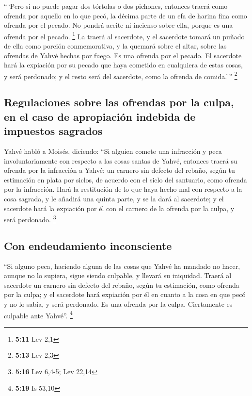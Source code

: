 \begin{paracol}{2}
 ``\,`Pero si no puede pagar dos tórtolas o dos pichones,
entonces traerá como ofrenda por aquello en lo que pecó, la décima parte
de un efa de harina fina como ofrenda por el pecado. No pondrá aceite ni
incienso sobre ella, porque es una ofrenda por el pecado. \footnote{\textbf{5:11}
  Lev 2,1}  La traerá al sacerdote, y el sacerdote tomará
un puñado de ella como porción conmemorativa, y la quemará sobre el
altar, sobre las ofrendas de Yahvé hechas por fuego. Es una ofrenda por
el pecado.  El sacerdote hará la expiación por su pecado
que haya cometido en cualquiera de estas cosas, y será perdonado; y el
resto será del sacerdote, como la ofrenda de comida.'\,'' \footnote{\textbf{5:13}
  Lev 2,3}

\hypertarget{regulaciones-sobre-las-ofrendas-por-la-culpa-en-el-caso-de-apropiaciuxf3n-indebida-de-impuestos-sagrados}{%
\subsection{Regulaciones sobre las ofrendas por la culpa, en el caso de
apropiación indebida de impuestos
sagrados}\label{regulaciones-sobre-las-ofrendas-por-la-culpa-en-el-caso-de-apropiaciuxf3n-indebida-de-impuestos-sagrados}}

 Yahvé habló a Moisés, diciendo:  ``Si
alguien comete una infracción y peca involuntariamente con respecto a
las cosas santas de Yahvé, entonces traerá su ofrenda por la infracción
a Yahvé: un carnero sin defecto del rebaño, según tu estimación en plata
por siclos, de acuerdo con el siclo del santuario, como ofrenda por la
infracción.  Hará la restitución de lo que haya hecho mal
con respecto a la cosa sagrada, y le añadirá una quinta parte, y se la
dará al sacerdote; y el sacerdote hará la expiación por él con el
carnero de la ofrenda por la culpa, y será perdonado. \footnote{\textbf{5:16}
  Lev 6,4-5; Lev 22,14}

\hypertarget{con-endeudamiento-inconsciente}{%
\subsection{Con endeudamiento
inconsciente}\label{con-endeudamiento-inconsciente}}

 ``Si alguno peca, haciendo alguna de las cosas que Yahvé
ha mandado no hacer, aunque no lo supiera, sigue siendo culpable, y
llevará su iniquidad.  Traerá al sacerdote un carnero sin
defecto del rebaño, según tu estimación, como ofrenda por la culpa; y el
sacerdote hará expiación por él en cuanto a la cosa en que pecó y no lo
sabía, y será perdonado.  Es una ofrenda por la culpa.
Ciertamente es culpable ante Yahvé''. \footnote{\textbf{5:19} Is 53,10}


\end{paracol}
